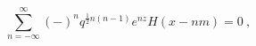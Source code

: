 \begin{equation}
\sum_{n=-\infty}^\infty (-)^n q^{\frac{1}{2}n(n-1)} e^{nz}H(x-nm)=0 \ , 
\label{dh}
\end{equation}

